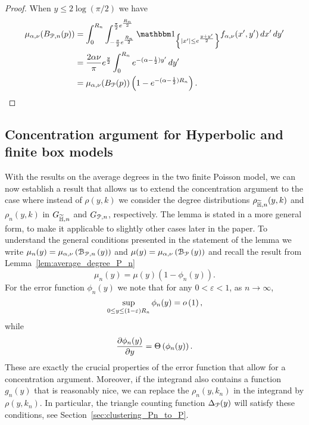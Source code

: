 \begin{proof}
When $y \le 2 \log(\pi/2)$ we have
\begin{align*}
	\mu_{\alpha,\nu}(B_{\Pcal,n}(p))
	&= \int_0^{R_n} \int_{-\frac{\pi}{2}e^{\frac{R_n}{2}}}^{\frac{\pi}{2}e^{\frac{R_n}{2}}} 
		\ind{|x^\prime| \le e^{\frac{y+y^\prime}{2}}} f_{\alpha,\nu}(x^\prime,y^\prime) \, dx^\prime \, dy^\prime\\
	&= \frac{2 \alpha \nu}{\pi} e^{\frac{y}{2}} \int_0^{R_n} e^{-(\alpha - \frac{1}{2})y^\prime} \, dy^\prime\\
	&= \mu_{\alpha,\nu}(B_\Pcal(p))\left(1 - e^{-(\alpha - \frac{1}{2})R_n}\right).
\end{align*}
\end{proof}

\subsection{Concentration argument for Hyperbolic and finite box models}

With the results on the average degrees in the two finite Poisson model, we can now establish a result that allows us to extend the concentration argument to the case where instead of $\rho(y,k)$ we consider the degree distributions $\rho_{\widetilde{\mathbb{H}},n}(y,k)$ and $\rho_{n}(y,k)$ in $G_{\widetilde{\mathbb{H}},n}$ and $G_{{\mathcal P},n}$, respectively. The lemma is stated in a more general form, to make it applicable to slightly other cases later in the paper. To understand the general conditions presented in the statement of the lemma we write $\mu_n(y) = \mu_{\alpha,\nu}\left({\mathcal B}_{{\mathcal P},n}\left(y\right)\right)$ and $\mu(y) = \mu_{\alpha,\nu}\left({\mathcal B}_{{\mathcal P}}\left(y\right)\right)$ and recall the result from Lemma~\ref{lem:average_degree_P_n}
\[
	\mu_n(y) = \mu(y)(1 - \phi_n(y)).
\]
For the error function $\phi_n(y)$ we note that for any $0 < \varepsilon < 1$, as $n \to \infty$, 
\[
	\sup_{0 \le y \le (1-\varepsilon)R_n} \phi_n(y) = o\left(1\right),
\]
while
\[
	\frac{\partial \phi_n(y)}{\partial y} = \Theta\left(\phi_n(y)\right).
\]
These are exactly the crucial properties of the error function that allow for a concentration argument. Moreover, if the integrand also contains a function $g_n(y)$ that is reasonably nice, we can replace the $\rho_{n}(y,k_n)$ in the integrand by $\rho(y,k_n)$. In particular, the triangle counting function $\Delta_{{\mathcal P}}(y)$ will satisfy these conditions, see Section~\ref{sec:clustering_Pn_to_P}.

